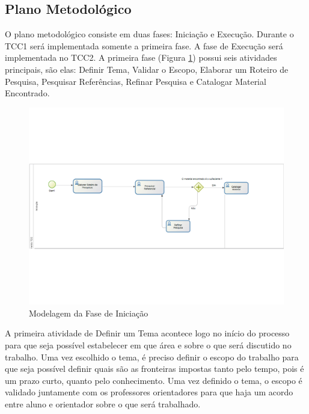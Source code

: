 \subsection{Plano Metodológico}
\label{plano_metodologico}
O plano metodológico consiste em duas fases: Iniciação e Execução. Durante o TCC1 será implementada somente a primeira fase. A fase de Execução será implementada no TCC2. A primeira fase (Figura \ref{img:iniciacao}) possui seis atividades principais, são elas: Definir Tema, Validar o Escopo, Elaborar um Roteiro de Pesquisa, Pesquisar Referências, Refinar Pesquisa e Catalogar Material Encontrado.

\graphicspath{{figuras/}}
\begin{figure}
\centering
\includegraphics[scale=0.50]{iniciacao}
\caption{Modelagem da Fase de Iniciação}
\label{img:iniciacao}
\end{figure}

A primeira atividade de Definir um Tema acontece logo no início do processo para que seja possível estabelecer em que área e sobre o que será discutido no trabalho. Uma vez escolhido o tema, é preciso definir o escopo do trabalho para que seja possível definir quais são as fronteiras impostas tanto pelo tempo, pois é um prazo curto, quanto pelo conhecimento. Uma vez definido o tema, o escopo é validado juntamente com os professores orientadores para que haja um acordo entre aluno e orientador sobre o que será trabalhado.


